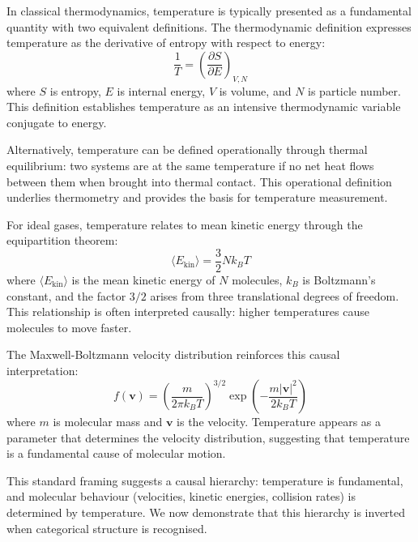 \documentclass[12pt,a4paper]{article}
\theoremstyle{definition}
\theoremstyle{remark}
\begin{document}
In classical thermodynamics, temperature is typically presented as a fundamental quantity with two equivalent definitions. The thermodynamic definition expresses temperature as the derivative of entropy with respect to energy:
\begin{equation}
\frac{1}{T} = \left(\frac{\partial S}{\partial E}\right)_{V,N}
\label{eq:temperature_standard}
\end{equation}
where $S$ is entropy, $E$ is internal energy, $V$ is volume, and $N$ is particle number. This definition establishes temperature as an intensive thermodynamic variable conjugate to energy.

Alternatively, temperature can be defined operationally through thermal equilibrium: two systems are at the same temperature if no net heat flows between them when brought into thermal contact. This operational definition underlies thermometry and provides the basis for temperature measurement.

For ideal gases, temperature relates to mean kinetic energy through the equipartition theorem:
\begin{equation}
\langle E_{\text{kin}} \rangle = \frac{3}{2} N k_B T
\label{eq:equipartition}
\end{equation}
where $\langle E_{\text{kin}} \rangle$ is the mean kinetic energy of $N$ molecules, $k_B$ is Boltzmann's constant, and the factor $3/2$ arises from three translational degrees of freedom. This relationship is often interpreted causally: higher temperatures cause molecules to move faster.

The Maxwell-Boltzmann velocity distribution reinforces this causal interpretation:
\begin{equation}
f(\mathbf{v}) = \left(\frac{m}{2\pi k_B T}\right)^{3/2} \exp\left(-\frac{m|\mathbf{v}|^2}{2k_B T}\right)
\label{eq:maxwell_boltzmann}
\end{equation}
where $m$ is molecular mass and $\mathbf{v}$ is the velocity. Temperature appears as a parameter that determines the velocity distribution, suggesting that temperature is a fundamental cause of molecular motion.

This standard framing suggests a causal hierarchy: temperature is fundamental, and molecular behaviour (velocities, kinetic energies, collision rates) is determined by temperature. We now demonstrate that this hierarchy is inverted when categorical structure is recognised.
\end{document}
